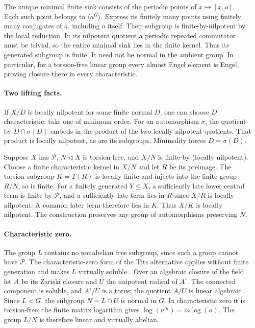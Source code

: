 The unique minimal finite sink consists of the periodic points
of \(x\mapsto[x,a]\). Each such point belongs to
\(\langle a^G\rangle\). Express its finitely many points using
finitely many conjugates of \(a\), including \(a\) itself.
Their subgroup is finite-by-nilpotent by the local reduction.
In its nilpotent quotient a periodic repeated commutator must
be trivial, so the entire minimal sink lies in the finite kernel.
Thus its generated subgroup is finite. It need not be normal
in the ambient group. In particular, for a torsion-free linear
group every almost Engel element is Engel, proving closure there
in every characteristic.

\paragraph{Two lifting facts.}
If \(X/D\) is locally nilpotent for some finite normal \(D\),
one can choose \(D\) characteristic: take one of minimum order.
For an automorphism \(\sigma\), the quotient by
\(D\cap\sigma(D)\) embeds in the product of the two locally
nilpotent quotients. That product is locally nilpotent, as are
its subgroups. Minimality forces \(D=\sigma(D)\).

Suppose \(X\) has \(\mathcal P\), \(N\lhd X\) is torsion-free,
and \(X/N\) is finite-by-(locally nilpotent).
Choose a finite characteristic kernel in \(X/N\) and let \(R\)
be its preimage. The torsion subgroup \(K=T(R)\) is locally
finite and injects into the finite group \(R/N\), so is finite.
For a finitely generated \(Y\le X\), a sufficiently late lower
central term is finite by \(\mathcal P\), and a sufficiently
late term lies in \(R\) since \(X/R\) is locally nilpotent.
A common later term therefore lies in \(K\).
Thus \(X/K\) is locally nilpotent. The construction preserves
any group of automorphisms preserving \(N\).

\paragraph{Characteristic zero.}
The group \(L\) contains no nonabelian free subgroup, since such
a group cannot have \(\mathcal P\).
The characteristic-zero form of the Tits alternative applies
without finite generation and makes \(L\) virtually soluble
\cite[Theorem~1]{tits}.
Over an algebraic closure of the field let \(A\) be its Zariski
closure and \(U\) the unipotent radical of \(A^\circ\).
The connected component is soluble, and \(A^\circ/U\) is a torus;
the quotient \(A/U\) is linear algebraic
\cite{milne-algebraic}.
Since \(L\lhd G\), the subgroup \(N=L\cap U\) is normal in \(G\).
In characteristic zero it is torsion-free: the finite matrix
logarithm gives \(\log(u^m)=m\log(u)\).
The group \(L/N\) is therefore linear and virtually abelian.

